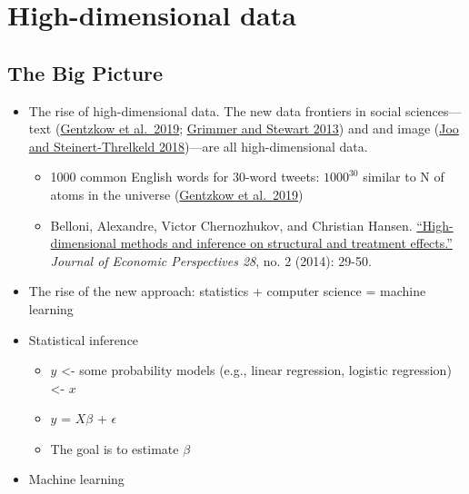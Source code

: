 \documentclass[
]{book}
\begin{document}
\hypertarget{machine_learning}{%
\chapter{High-dimensional data}\label{machine_learning}}

\hypertarget{the-big-picture-8}{%
\section{The Big Picture}\label{the-big-picture-8}}

\begin{itemize}
\item
  The rise of high-dimensional data. The new data frontiers in social sciences---text (\href{https://web.stanford.edu/~gentzkow/research/text-as-data.pdf}{Gentzkow et al.~2019}; \href{https://www.jstor.org/stable/pdf/24572662.pdf?casa_token=SQdSI4R_VdwAAAAA:4QiVLhCXqr9f0qNMM9U75EL5JbDxxnXxUxyIfDf0U8ZzQx9szc0xVqaU6DXG4nHyZiNkvcwGlgD6H0Lxj3y0ULHwgkf1MZt8-9TPVtkEH9I4AHgbTg}{Grimmer and Stewart 2013}) and and image (\href{https://arxiv.org/pdf/1810.01544}{Joo and Steinert-Threlkeld 2018})---are all high-dimensional data.

  \begin{itemize}
  \item
    1000 common English words for 30-word tweets: \(1000^{30}\) similar to N of atoms in the universe (\href{https://web.stanford.edu/~gentzkow/research/text-as-data.pdf}{Gentzkow et al.~2019})
  \item
    Belloni, Alexandre, Victor Chernozhukov, and Christian Hansen. \href{https://pubs.aeaweb.org/doi/pdfplus/10.1257/jep.28.2.29}{``High-dimensional methods and inference on structural and treatment effects.''} \emph{Journal of Economic Perspectives 28}, no. 2 (2014): 29-50.
  \end{itemize}
\item
  The rise of the new approach: statistics + computer science = machine learning
\item
  Statistical inference

  \begin{itemize}
  \item
    \(y\) \textless- some probability models (e.g., linear regression, logistic regression) \textless- \(x\)
  \item
    \(y\) = \(X\beta\) + \(\epsilon\)
  \item
    The goal is to estimate \(\beta\)
  \end{itemize}
\item
  Machine learning


\end{itemize}
\end{document}
